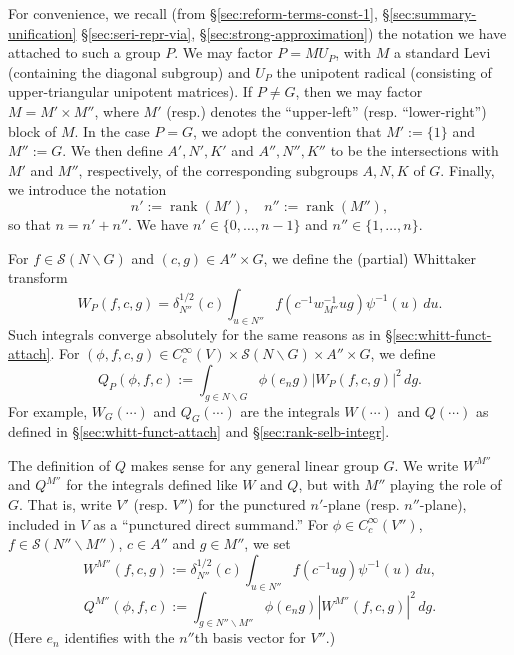 \documentclass[reqno]{amsart}
\DeclareMathOperator{\rank}{rank}
\theoremstyle{plain} \newtheorem{theorem} {Theorem}
\theoremstyle{definition} \newtheorem{definition} [theorem] {Definition}
\theoremstyle{itplain} %
\numberwithin{equation}{section}
\numberwithin{theorem}{section}
\begin{document}
For convenience, we recall (from \S\ref{sec:reform-terms-const-1}, \S\ref{sec:summary-unification} \S\ref{sec:seri-repr-via}, \S\ref{sec:strong-approximation}) the notation we have attached to such a group $P$.  We may factor $P = M {U_P}$, with $M$ a standard Levi (containing the diagonal subgroup) and ${U_P}$ the unipotent radical (consisting of upper-triangular unipotent matrices).  If $P \neq G$, then we may factor $M = M' \times M''$, where $M'$ (resp.) denotes the ``upper-left'' (resp. ``lower-right'') block of $M$.  In the case $P = G$, we adopt the convention that $M' := \{1\}$ and $M'' := G$.  We then define $A', N', K'$ and $A'', N'', K''$ to be the intersections with $M'$ and $M''$, respectively, of the corresponding subgroups $A,N,K$ of $G$.  Finally, we introduce the notation
\begin{equation*}
  n' := \rank(M'), \quad n'' := \rank(M''),
\end{equation*}
so that $n = n' + n''$.  We have $n' \in \{0,\dotsc,n-1\}$ and $n'' \in \{1, \dotsc, n\}$.

For $f \in \mathcal{S}(N \backslash G)$ and $(c,g) \in A'' \times G$, we define the (partial) Whittaker transform
\begin{equation*}
  W_P(f,c,g) = \delta_{N''}^{1/2}(c) \int _{u \in N''} f(c^{-1} w^{-1}_{M''} u g) \psi ^{-1} (u) \,d u.
\end{equation*}
Such integrals converge absolutely for the same reasons as in \S\ref{sec:whitt-funct-attach}.  For $(\phi,f,c,g) \in C_c^\infty(V) \times \mathcal{S}(N \backslash G) \times A'' \times G$, we define
\begin{equation*}
  Q_P(\phi,f,c) := \int _{g \in N \backslash G}
  \phi(e_n g) |W_P(f,c,g)|^2 \, d g.
\end{equation*}
For example, $W_G(\dotsb)$ and $Q_G(\dotsb)$ are the integrals $W(\dotsb)$ and $Q(\dotsb)$ as defined in \S\ref{sec:whitt-funct-attach} and \S\ref{sec:rank-selb-integr}.

The definition of $Q$ makes sense for any general linear group $G$.  We write $W^{M''}$ and $Q^{M''}$ for the integrals defined like $W$ and $Q$, but with $M''$ playing the role of $G$.  That is, write $V'$ (resp. $V''$) for the punctured $n'$-plane (resp. $n''$-plane), included in $V$ as a ``punctured direct summand.''  For $\phi \in C_c^\infty(V'')$, $f \in \mathcal{S}(N'' \backslash M'')$, $c \in A''$ and $g \in M''$, we set
\begin{equation*}
  W^{M''}(f,c,g) := \delta_{N''}^{1/2}(c) \int _{u \in N''} f(c^{-1} u g) \psi^{-1}(u) \, d u,
\end{equation*}
\begin{equation*}
  Q^{M''}(\phi,f,c) := \int _{g \in N'' \backslash M''} \phi (e_{n} g) |W^{M''}(f,c,g)|^2 \, d g.
\end{equation*}
(Here $e_n$ identifies with the $n''$th basis vector for $V''$.)
\end{document}
